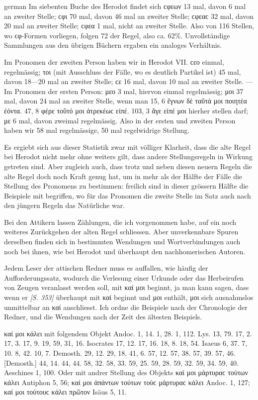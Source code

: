\begin{otherlanguage*}{german}
Im siebenten Buche des Herodot findet sich ϲφεων 13 mal, davon 6 mal an zweiter Stelle; ϲφι 70 mal, davon 46 mal an zweiter Stelle; ϲφεαϲ 32 mal, davon 20 mal an zweiter Stelle; ϲφεα 1 mal, nicht an zweiter Stelle. Also von 116 Stellen, wo ϲφ-Formen vorliegen, folgen 72 der Regel, also ca. 62\%. Unvollständige Sammlungen aus den übrigen Büchern ergaben ein analoges Verhältnis.

Im Pronomen der zweiten Person haben wir in Herodot VII. ϲεο einmal, regelmässig; τοι (mit Ausschluss der Fälle, wo es deutlich Partikel ist) 45 mal, davon 18—20 mal an zweiter Stelle; ϲε 16 mal, davon 10 mal an zweiter Stelle. — Im Pronomen der ersten Person: μεο 3 mal, hiervon einmal regelmässig; μοι 37 mal, davon 24 mal an zweiter Stelle, wenn man 15, 6 ἔγνων δὲ ταῦτά μοι ποιητέα ἐόντα. 47, 8 φέρε τοῦτό μοι ἀτρεκέωϲ εἰπέ. 103, 3 ἄγε εἰπέ μοι hierher stellen darf; με 6 mal, davon zweimal regelmässig. Also in der ersten und zweiten Person haben wir 58 mal regelmässige, 50 mal regelwidrige Stellung.

Es ergiebt sich aus dieser Statistik zwar mit völliger Klarheit, dass die alte Regel bei Herodot nicht mehr ohne weiters gilt, dass andere Stellungsregeln in Wirkung getreten sind. Aber zugleich auch, dass trotz und neben diesen neuern Regeln die alte Regel doch noch Kraft genug hat, um in mehr als der Hälfte der Fälle die Stellung des Pronomens zu bestimmen: freilich sind in dieser grössern Hälfte die Beispiele mit begriffen, wo für das Pronomen die zweite Stelle im Satz auch nach den jüngern Regeln das Natürliche war.

Bei den Attikern lassen Zählungen, die ich vorgenommen habe, auf ein noch weiteres Zurückgehen der alten Regel schliessen. Aber unverkennbare Spuren derselben finden sich in bestimmten Wendungen und Wortverbindungen auch noch bei ihnen, wie bei Herodot und überhaupt den nachhomerischen Autoren.

Jedem Leser der attischen Redner muss es auffallen, wie häufig der Aufforderungssatz, wodurch die Verlesung einer Urkunde oder das Herbeirufen von Zeugen veranlasst werden soll, mit καί μοι beginnt, ja man kann sagen, dass wenn er \hypertarget{p353}{\emph{[S. 353]}}\label{p353} überhaupt mit καί beginnt und μοι enthält, μοι sich ausnahmslos unmittelbar an καί anschliesst. Ich ordne die Beispiele nach der Chronologie der Redner, und die Wendungen nach der Zeit des ältesten Beispiels.

καί μοι κάλει mit folgendem Objekt Andoc. 1, 14. 1, 28. 1, 112. Lys. 13, 79. 17, 2. 17, 3. 17, 9. 19, 59, 31, 16. Isocrates 17, 12. 17, 16. 18, 8. 18, 54. Isaeus 6, 37. 7, 10. 8, 42. 10, 7. Demosth. 29, 12. 29, 18. 41, 6. 57, 12. 57, 38. 57, 39. 57, 46. [Demosth.] 44, 14. 44, 44. 58, 32. 58, 33. 59, 25. 59, 28. 59, 32. 59, 34. 59, 40. Aeschines 1, 100. Oder mit andrer Stellung des Objekts καί μοι μάρτυραϲ τούτων κάλει Antiphon 5, 56; καί μοι ἁπάντων τούτων τοὺϲ μάρτυραϲ κάλει Andoc. 1, 127; καί μοι τούτουϲ κάλει πρῶτον Isäus 5, 11.


\end{otherlanguage*}
